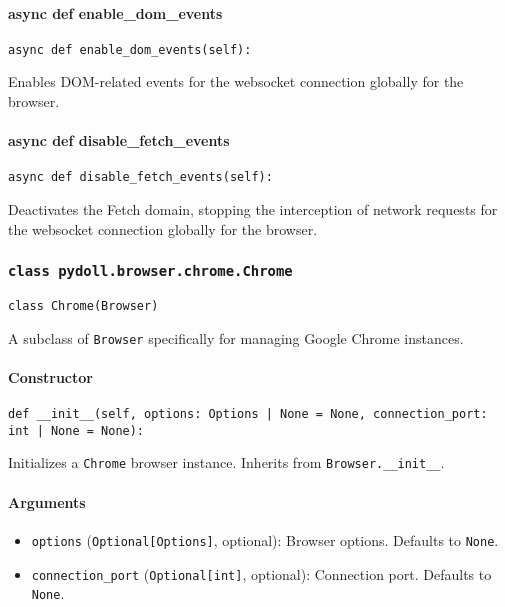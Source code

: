 \documentclass{article}
\begin{document}
\paragraph{async def enable\_dom\_events}

\begin{lstlisting}[style=pythonstyle]
async def enable_dom_events(self):
\end{lstlisting}

\noindent Enables DOM-related events for the websocket connection globally for the browser.

\paragraph{async def disable\_fetch\_events}

\begin{lstlisting}[style=pythonstyle]
async def disable_fetch_events(self):
\end{lstlisting}

\noindent Deactivates the Fetch domain, stopping the interception of network requests for the websocket connection globally for the browser.

\subsubsection*{\texttt{class pydoll.browser.chrome.Chrome}}
\noindent\texttt{class Chrome(Browser)}

\noindent A subclass of \lstinline[style=pythonstyle]|Browser| specifically for managing Google Chrome instances.

\paragraph{Constructor}

\begin{lstlisting}[style=pythonstyle]
def __init__(self, options: Options | None = None, connection_port: int | None = None):
\end{lstlisting}

\noindent Initializes a \lstinline[style=pythonstyle]|Chrome| browser instance. Inherits from \lstinline[style=pythonstyle]|Browser.__init__|.

\paragraph{Arguments}

\begin{itemize}
    \item \lstinline[style=pythonstyle]|options| (\lstinline[style=pythonstyle]|Optional[Options]|, optional): Browser options. Defaults to \lstinline[style=pythonstyle]|None|.
    \item \lstinline[style=pythonstyle]|connection_port| (\lstinline[style=pythonstyle]|Optional[int]|, optional): Connection port. Defaults to \lstinline[style=pythonstyle]|None|.
\end{itemize}
\end{document}
